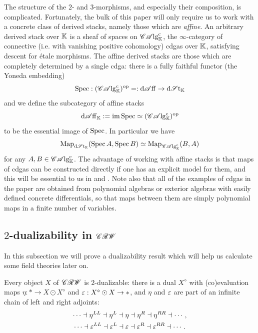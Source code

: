 The structure of the $2$- and $3$-morphisms, and especially their composition, is complicated. Fortunately, the bulk of this paper will only require us to work with a concrete class of derived stacks, namely those which are \emph{affine}. An arbitrary derived stack over $\mathbb{K}$ is a sheaf of spaces on $\mathscr{CA}\mathrm{lg}^{\mathrm{c}}_{\mathbb{K}}$, the $\infty$-category of connective (i.e. with vanishing positive cohomology) cdgas over $\mathbb{K}$, satisfying descent for \'etale morphisms. The affine derived stacks are those which are completely determined by a single cdga: there is a fully faithful functor (the Yoneda embedding)
\begin{equation*}
	\operatorname{Spec} : (\mathscr{CA}\mathrm{lg}_{\mathbb{K}}^{\mathrm{c}})^{\mathrm{op}} =: \mathrm{d}\mathscr{A}\mathrm{ff} \to \mathrm{d}\mathscr{S}\mathrm{t}_{\mathbb{K}}
\end{equation*}
and we define the subcategory of affine stacks
\begin{equation*}
	\mathrm{d}\mathscr{A}\mathrm{ff}_{\mathbb{K}} := \operatorname{im} \operatorname{Spec} \simeq (\mathscr{CA}\mathrm{lg}_{\mathbb{K}}^{\mathrm{c}})^{\mathrm{op}}
\end{equation*}
to be the essential image of $\operatorname{Spec}$. In particular we have
\begin{equation*}
	\mathrm{Map}_{\mathrm{d}\mathscr{S}\mathrm{t}_{\mathbb{K}}}(\operatorname{Spec} A, \operatorname{Spec} B) \simeq \mathrm{Map}_{\mathscr{CA}\mathrm{lg}_{\mathbb{K}}^{\mathrm{c}}}(B, A)
\end{equation*}
for any $A, B \in \mathscr{CA}\mathrm{lg}_{\mathbb{K}}^{\mathrm{c}}$. The advantage of working with affine stacks is that maps of cdgas can be constructed directly if one has an explicit model for them, and this will be essential to us in  and . Note also that all of the examples of cdgas in the paper are obtained from polynomial algebras or exterior algebras with easily defined concrete differentials, so that maps between them are simply polynomial maps in a finite number of variables.

\subsection{$2$-dualizability in $\mathscr{CRW}$}

In this subsection we will prove a dualizability result which will help us calculate some field theories later on.

\begin{thm} \label{thm:2-dual-crw}
	Every object $X$ of $\mathscr{CRW}$ is $2$-dualizable: there is a dual $X^\diamond$ with (co)evaluation maps $\eta : \ast \to X \odot X^\diamond$ and $\varepsilon : X^\diamond \odot X \to \ast$, and $\eta$ and $\varepsilon$ are part of an infinite chain of left and right adjoints:
	\begin{gather*}
		\dotsb \dashv \eta^{LL} \dashv \eta^L \dashv \eta \dashv \eta^R \dashv \eta^{RR} \dashv \dotsb, \\
		\dotsb \dashv \varepsilon^{LL} \dashv \varepsilon^L \dashv \varepsilon \dashv \varepsilon^R \dashv \varepsilon^{RR} \dashv \dotsb.
	\end{gather*}
\end{thm}

